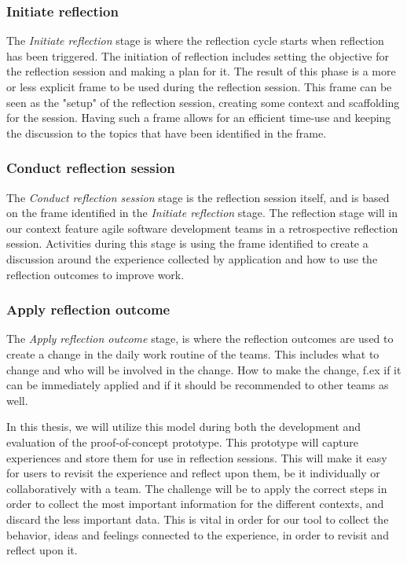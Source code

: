 \subsubsection{Initiate reflection}
The \emph{Initiate reflection} stage is where the reflection cycle starts when reflection has been triggered. The initiation of reflection includes setting the objective for the reflection session and making a plan for it. The result of this phase is a more or less explicit frame to be used during the reflection session. This frame can be seen as the "setup" of the reflection session, creating some context and scaffolding for the session. Having such a frame allows for an efficient time-use and keeping the discussion to the topics that have been identified in the frame. 
\subsubsection{Conduct reflection session}
The \emph{Conduct reflection session} stage is the reflection session itself, and is based on the frame identified in the \emph{Initiate reflection} stage. The reflection stage will in our context feature agile software development teams in a retrospective reflection session. Activities during this stage is using the frame identified to create a discussion around the experience collected by application and how to use the reflection outcomes to improve work. 

\subsubsection{Apply reflection outcome}
The \emph{Apply reflection outcome} stage, is where the reflection outcomes are used to create a change in the daily work routine of the teams. This includes what to change and who will be involved in the change. How to make the change, f.ex if it can be immediately applied and if it should be recommended to other teams as well. 

In this thesis, we will utilize this model during both the development and evaluation of the proof-of-concept prototype. This prototype will capture experiences and store them for use in reflection sessions. This will make it easy for users to revisit the experience and reflect upon them, be it individually or collaboratively with a team. The challenge will be to apply the correct steps in order to collect the most important information for the different contexts, and discard the less important data. This is vital in order for our tool to collect the behavior, ideas and feelings connected to the experience, in order to revisit and reflect upon it. 

